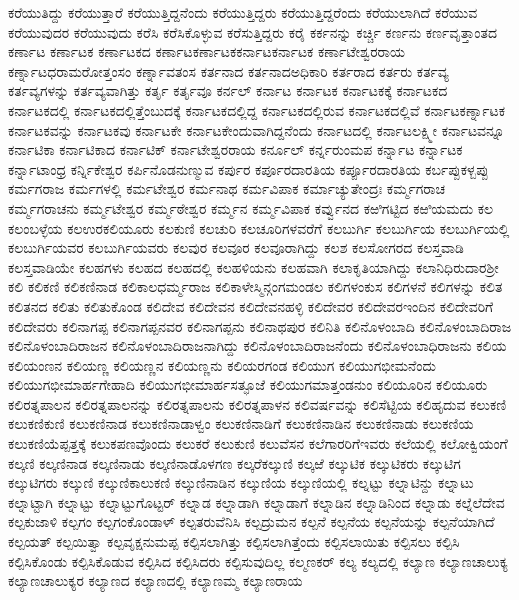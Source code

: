 {ಕರೆಯುತಿದ್ದು
ಕರೆಯುತ್ತಾರೆ
ಕರೆಯುತ್ತಿದ್ದನೆಂದು
ಕರೆಯುತ್ತಿದ್ದರು
ಕರೆಯುತ್ತಿದ್ದರೆಂದು
ಕರೆಯುಲಾಗಿದೆ
ಕರೆಯುವ
ಕರೆಯುವುದರ
ಕರೆಯುವುದು
ಕರೆಸಿ
ಕರೆಸಿಕೊಳ್ಳುವ
ಕರೆಸುತ್ತಿದ್ದರು
ಕರೈ
ಕರ್ಕನನ್ನು
ಕರ್ಚ್ಚಿ
ಕರ್ಣನು
ಕರ್ಣವೃತ್ತಾಂತದ
ಕರ್ಣಾಟ
ಕರ್ಣಾಟಕ
ಕರ್ಣಾಟಕದ
ಕರ್ಣಾಟಕರ್ಣಾಟಕಕರ್ನಾಟಕರ್ನಾಟಕ
ಕರ್ಣಾಟೇಶ್ವರರಾಯ
ಕರ್ಣ್ನಾಟಧರಾಮರೋತ್ತಂಸಂ
ಕರ್ಣ್ನಾವತಂಸ
ಕರ್ತನಾದ
ಕರ್ತನಾದಅಧಿಕಾರಿ
ಕರ್ತರಾದ
ಕರ್ತರು
ಕರ್ತವ್ಯ
ಕರ್ತವ್ಯಗಳನ್ನು
ಕರ್ತವ್ಯವಾಗಿತ್ತು
ಕರ್ತೃ
ಕರ್ತೃವೂ
ಕರ್ನಲ್
ಕರ್ನಾಟ
ಕರ್ನಾಟಕ
ಕರ್ನಾಟಕಕ್ಕೆ
ಕರ್ನಾಟಕದ
ಕರ್ನಾಟಕದಲ್ಲಿ
ಕರ್ನಾಟಕದಲ್ಲಿತ್ತೆಂಬುದಕ್ಕೆ
ಕರ್ನಾಟಕದಲ್ಲಿದ್ದ
ಕರ್ನಾಟಕದಲ್ಲಿರುವ
ಕರ್ನಾಟಕದಲ್ಲಿವೆ
ಕರ್ನಾಟಕರ್ಣ್ನಾಟಕ
ಕರ್ನಾಟಕವನ್ನು
ಕರ್ನಾಟಕವು
ಕರ್ನಾಟಕೇ
ಕರ್ನಾಟಕೇಂದುವಾಗಿದ್ದನೆಂದು
ಕರ್ನಾಟದಲ್ಲಿ
ಕರ್ನಾಟಲಕ್ಷ್ಮೀ
ಕರ್ನಾಟವನ್ನೂ
ಕರ್ನಾಟಿಕಾ
ಕರ್ನಾಟಿಕಾದ
ಕರ್ನಾಟಿಕ್
ಕರ್ನಾಟೇಶ್ವರರಾಯ
ಕರ್ನೂಲ್
ಕರ್ನ್ನರುಂಮಪ
ಕರ್ನ್ನಾಟ
ಕರ್ನ್ನಾಟಕ
ಕರ್ನ್ನಾಟಾಂಧ್ರ
ಕರ್ನ್ನಿಕೇಶ್ವರ
ಕರ್ಪಿನೊಡನುಣ್ಮುವ
ಕರ್ಪುರ
ಕರ್ಪೂರದಾರತಿಯ
ಕರ್ಪ್ಪೂರದಾರತಿಯ
ಕರ್ಬಪ್ಪುಕಳ್ಬಪ್ಪು
ಕರ್ಮಗರಾಜ
ಕರ್ಮಗಳಲ್ಲಿ
ಕರ್ಮಟೇಶ್ವರ
ಕರ್ಮನಾಥ
ಕರ್ಮವಿಪಾಕ
ಕರ್ಮಾಚ್ಯುತೇಂದ್ರಃ
ಕರ್ಮ್ಮಗರಾಚ
ಕರ್ಮ್ಮಗರಾಚನು
ಕರ್ಮ್ಮಟೇಶ್ವರ
ಕರ್ಮ್ಮಠೇಶ್ವರ
ಕರ್ಮ್ಮನ
ಕರ್ಮ್ಮವಿಪಾಕ
ಕರ್ವ್ವುನದ
ಕಱಿಗಟ್ಟಿದ
ಕಱಿಯಮದು
ಕಲ
ಕಲಂಬಳ್ಳೆಯ
ಕಲಉರಕಲಿಯೂರು
ಕಲಕುಣಿ
ಕಲಚುರಿ
ಕಲಚೂರಿಗಳವರೆಗೆ
ಕಲಬುರ್ಗಿ
ಕಲಬುರ್ಗಿಯ
ಕಲಬುರ್ಗಿಯಲ್ಲಿ
ಕಲಬುರ್ಗಿಯವರ
ಕಲಬುರ್ಗಿಯವರು
ಕಲವುರ
ಕಲವೂರ
ಕಲವೂರಾಗಿದ್ದು
ಕಲಶ
ಕಲಸೋಗರದ
ಕಲಸ್ತವಾಡಿ
ಕಲಸ್ತವಾಡಿಯೇ
ಕಲಹಗಳು
ಕಲಹದ
ಕಲಹದಲ್ಲಿ
ಕಲಹಳಿಯನು
ಕಲಹವಾಗಿ
ಕಲಾಕೃತಿಯಾಗಿದ್ದು
ಕಲಾನಿಧಿರುದಾರಶ್ರೀ
ಕಲಿ
ಕಲಿಕಣಿ
ಕಲಿಕಣಿನಾಡ
ಕಲಿಕಾಲಧರ್ಮ್ಮರಾಜ
ಕಲಿಕಾಳೇಸ್ಮಿನ್ಗಂಗಮಂಡಲ
ಕಲಿಗಳಂಕುಸ
ಕಲಿಗಳನೆ
ಕಲಿಗಳನ್ನು
ಕಲಿತ
ಕಲಿತನದ
ಕಲಿತು
ಕಲಿತುಕೊಂಡ
ಕಲಿದೇವ
ಕಲಿದೇವನ
ಕಲಿದೇವನಹಳ್ಳಿ
ಕಲಿದೇವರ
ಕಲಿದೇವರಇಂದಿನ
ಕಲಿದೇವರಿಗೆ
ಕಲಿದೇವರು
ಕಲಿನಾಗಪ್ಪ
ಕಲಿನಾಗಪ್ಪನವರ
ಕಲಿನಾಗಪ್ಪನು
ಕಲಿನಾಥಪುರ
ಕಲಿನಿತಿ
ಕಲಿನೊಳಂಬಾದಿ
ಕಲಿನೊಳಂಬಾದಿರಾಜ
ಕಲಿನೊಳಂಬಾದಿರಾಜನ
ಕಲಿನೊಳಂಬಾದಿರಾಜನಾಗಿದ್ದು
ಕಲಿನೊಳಂಬಾದಿರಾಜನೆಂದು
ಕಲಿನೊಳಂಬಾಧಿರಾಜನು
ಕಲಿಯ
ಕಲಿಯಂಣನ
ಕಲಿಯಣ್ಣ
ಕಲಿಯಣ್ಣನ
ಕಲಿಯಣ್ಣನು
ಕಲಿಯರಗಂಡ
ಕಲಿಯುಗ
ಕಲಿಯುಗಭೀಮನೆಂದು
ಕಲಿಯುಗಭೀಮಾರ್ಹಗೇಹಾದಿ
ಕಲಿಯುಗಭೀಮಾರ್ಹಸತ್ಫೂಜೆ
ಕಲಿಯುಗಮಾತ್ತಂಡನುಂ
ಕಲಿಯೂರಿನ
ಕಲಿಯೂರು
ಕಲಿರತ್ನಪಾಲನ
ಕಲಿರತ್ನಪಾಲನನ್ನು
ಕಲಿರತ್ನಪಾಲನು
ಕಲಿರತ್ನಪಾಳನ
ಕಲಿವರ್ಷವನ್ನು
ಕಲಿಸೆಟ್ಟಿಯ
ಕಲಿಹೃದುವ
ಕಲುಕಣಿ
ಕಲುಕಣಿಕುಣಿ
ಕಲುಕಣಿನಾಡ
ಕಲುಕಣಿನಾಡಾಳ್ವಂ
ಕಲುಕಣಿನಾಡಿಗೆ
ಕಲುಕಣಿನಾಡಿನ
ಕಲುಕಣಿನಾಡು
ಕಲುಕಣಿಯ
ಕಲುಕಣಿಯೆಪ್ಪತ್ತಕ್ಕೆ
ಕಲುಕಪಣವೊಂದು
ಕಲುಕರೆ
ಕಲುಕುಣಿ
ಕಲುವೆಸನ
ಕಲೆಗಾರರಿಗೆಇವರು
ಕಲೆಯಲ್ಲಿ
ಕಲೋಕ್ವಿಯಂಗೆ
ಕಲ್ಕಣಿ
ಕಲ್ಕಣಿನಾಡ
ಕಲ್ಕಣಿನಾಡು
ಕಲ್ಕಣಿನಾಡೊಳಗಣ
ಕಲ್ಕರೆಕಲ್ಕುಣಿ
ಕಲ್ಕಱೆ
ಕಲ್ಕುಟಿಕ
ಕಲ್ಕುಟಿಕರು
ಕಲ್ಕುಟಿಗ
ಕಲ್ಕುಟಿಗರು
ಕಲ್ಕುಣಿ
ಕಲ್ಕುಣಿಕಾಲುಕಣಿ
ಕಲ್ಕುಣಿನಾಡಿನ
ಕಲ್ಕುಣಿಯ
ಕಲ್ಕುಣಿಯಲ್ಲಿ
ಕಲ್ನಟ್ಟು
ಕಲ್ನಾಟಿನ್ದು
ಕಲ್ನಾಟು
ಕಲ್ನಾಟ್ಟಾಗಿ
ಕಲ್ನಾಟ್ಟು
ಕಲ್ನಾಟ್ಟುಗೊಟ್ಟರ್
ಕಲ್ನಾಡ
ಕಲ್ನಾಡಾಗಿ
ಕಲ್ನಾಡಾಗೆ
ಕಲ್ನಾಡಿನ
ಕಲ್ನಾಡಿನಿಂದ
ಕಲ್ನಾಡು
ಕಲ್ನೆಲೆದೇವ
ಕಲ್ಪಕುಜಾಳಿ
ಕಲ್ಪಗಂ
ಕಲ್ಪಗಂಕೊಂಡಾಳ್
ಕಲ್ಪತರುವೆನಿಸಿ
ಕಲ್ಪದ್ರುಮನ
ಕಲ್ಪನೆ
ಕಲ್ಪನೆಯ
ಕಲ್ಪನೆಯನ್ನು
ಕಲ್ಪನೆಯಾಗಿದೆ
ಕಲ್ಪಯತ್
ಕಲ್ಪಯಿತ್ವಾ
ಕಲ್ಪವೃಕ್ಷನುಮಪ್ಪ
ಕಲ್ಪಿಸಲಾಗಿತ್ತು
ಕಲ್ಪಿಸಲಾಗಿತ್ತೆಂದು
ಕಲ್ಪಿಸಲಾಯಿತು
ಕಲ್ಪಿಸಲು
ಕಲ್ಪಿಸಿ
ಕಲ್ಪಿಸಿಕೊಂಡು
ಕಲ್ಪಿಸಿಕೊಡುವ
ಕಲ್ಪಿಸಿದ
ಕಲ್ಪಿಸಿದರು
ಕಲ್ಪಿಸುವುದಿಲ್ಲ
ಕಲ್ಮಣಕರ್
ಕಲ್ಯ
ಕಲ್ಯದಲ್ಲಿ
ಕಲ್ಯಾಣ
ಕಲ್ಯಾಣಚಾಲುಕ್ಯ
ಕಲ್ಯಾಣಚಾಲುಕ್ಯರ
ಕಲ್ಯಾಣದ
ಕಲ್ಯಾಣದಲ್ಲಿ
ಕಲ್ಯಾಣಮ್ಮ
ಕಲ್ಯಾಣರಾಯ
}
